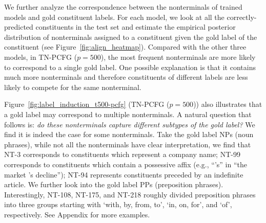 \documentclass[11pt]{article}
\begin{document}
We further analyze the correspondence between the nonterminals of trained models and gold constituent labels.
For each model, we look at all the correctly-predicted constituents in the test set and estimate the empirical posterior distribution of nonterminals assigned to a constituent given the gold label of the constituent (see Figure~\ref{fig:align_heatmap}).
Compared with the other three models,
in TN-PCFG ($p=500$), the most frequent nonterminals are more likely to correspond to a single gold label.
One possible explanation is that it contains much more nonterminals and therefore constituents of different labels are less likely to compete for the same nonterminal.

Figure~\ref{fig:label_induction_t500-pcfg} (TN-PCFG ($p=500$)) also illustrates that a gold label may correspond to multiple nonterminals. 
A natural question that follows is: \textit{do these nonterminals capture different subtypes of the gold label?}
We find it is indeed the case for some nonterminals.
Take the gold label NPs (noun phrases),
while not all the nonterminals have clear interpretation, 
we find that NT-3 corresponds to constituents which represent a company name;
NT-99 corresponds to constituents which contain a possessive affix (e.g., ``'s'' in ``the market 's decline'');
NT-94 represents constituents preceded by an indefinite article.
We further look into the gold label PPs (preposition phrases).
Interestingly, NT-108, NT-175, and NT-218 roughly divided preposition phrases into three groups starting with `with, by, from, to', `in, on, for', and `of', respectively. See Appendix for more examples.
\end{document}
